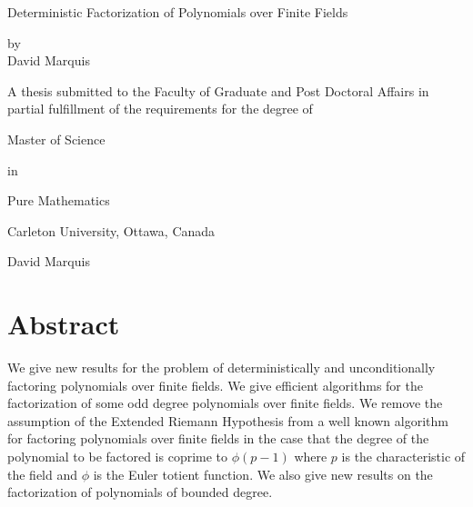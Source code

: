 \documentclass{article}
\theoremstyle{plain}
\theoremstyle{definition}
\begin{document}
\begin{center}
    {\huge 
    Deterministic Factorization of Polynomials over Finite Fields}
    \vspace{1.5cm}

by\\

    \vspace{1cm}
{\large
David Marquis}

    \vspace{1.5cm}
A thesis submitted to the Faculty of Graduate and Post Doctoral Affairs in
partial fulfillment of the requirements for the degree of 

\vspace{1.5cm}

{\large
Master of Science
}

\vspace{1cm}

in\\

\vspace{1cm}

{\large
Pure Mathematics
}

\vspace{1.5cm}

Carleton University, Ottawa, Canada

\vspace{1.5cm}


\vspace{0.5cm}

David Marquis
\end{center}

\thispagestyle{empty}
\pagebreak

\doublespacing

\pagebreak
\section*{Abstract}
    We give new results for the problem of deterministically and unconditionally factoring polynomials over finite fields. We give efficient algorithms for the factorization of some odd degree polynomials over finite fields. We remove the assumption of the Extended Riemann Hypothesis from a well known algorithm for factoring polynomials over finite fields in the case that the degree of the polynomial to be factored is coprime to $\phi(p-1)$ where $p$ is the characteristic of the field and $\phi$ is the Euler totient function. We also give new results on the factorization of polynomials of bounded degree.
		
\end{document}

